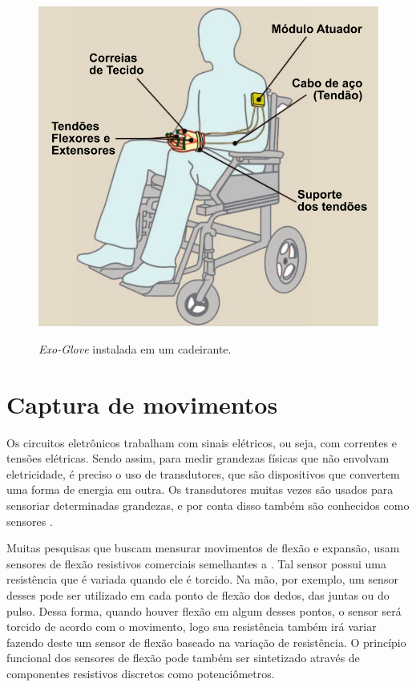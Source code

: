 \documentclass[
	12pt,				%
	openright,			%
	oneside,			%
	a4paper,			%
	english,			%
	brazil				%
	]{abntex2}
\begin{document}
		\begin{figure}[h!]
			\centering
			\caption{\textit{Exo-Glove} instalada em um cadeirante.}
  		\includegraphics[scale=0.35]{./figures/exo-glove-installed1.png}
  		\label{Fig:exo-glove-installed1}
		\end{figure}
		
		\section{Captura de movimentos}



		Os circuitos eletrônicos trabalham com sinais elétricos, ou seja, com correntes e tensões elétricas. Sendo assim, para medir grandezas físicas que não envolvam eletricidade, é preciso o uso de transdutores, que são dispositivos que convertem uma forma de energia em outra. Os transdutores muitas vezes são usados para sensoriar determinadas grandezas, e por conta disso também são conhecidos como sensores \cite{ncb2012eletronicabasica}.

		Muitas pesquisas que buscam mensurar movimentos de flexão e expansão, usam sensores de flexão resistivos comerciais semelhantes a \cite{flexsensor}. Tal sensor possui uma resistência que é variada quando ele é torcido. Na mão, por exemplo, um sensor desses pode ser utilizado em cada ponto de flexão dos dedos, das juntas ou do pulso. Dessa forma, quando houver flexão em algum desses pontos, o sensor será torcido de acordo com o movimento, logo sua resistência também irá variar fazendo deste um sensor de flexão baseado na variação de resistência. O princípio funcional dos sensores de flexão pode também ser sintetizado através de componentes resistivos discretos como potenciômetros. 
		
\end{document}

